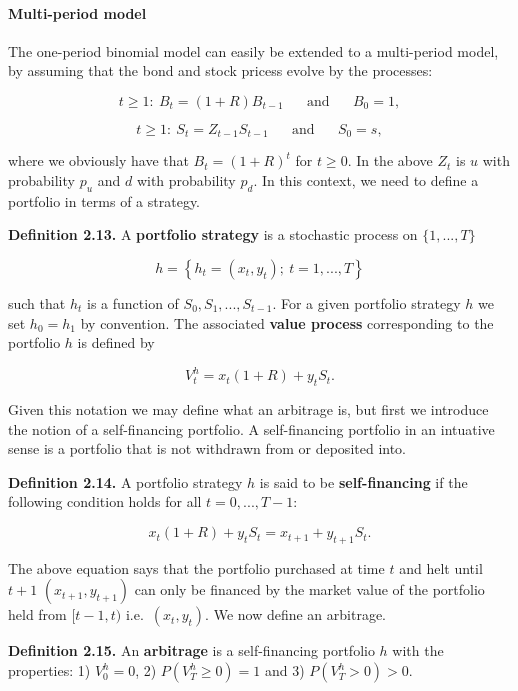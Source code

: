 \documentclass[
]{article}
\begin{document}
\hypertarget{multi-period-model}{%
\paragraph{Multi-period model}\label{multi-period-model}}

The one-period binomial model can easily be extended to a multi-period
model, by assuming that the bond and stock pricess evolve by the
processes:

\[
t\ge1:\ B_t=(1+R)B_{t-1}\hspace{20pt}\text{and}\hspace{20pt}B_0=1,
\]

\[
t\ge1:\ S_t=Z_{t-1}S_{t-1}\hspace{20pt}\text{and}\hspace{20pt}S_0=s,
\]

where we obviously have that \(B_t=(1+R)^t\) for \(t\ge 0\). In the
above \(Z_t\) is \(u\) with probability \(p_u\) and \(d\) with
probability \(p_d\). In this context, we need to define a portfolio in
terms of a strategy.

\textbf{Definition 2.13.} A \textbf{portfolio strategy} is a stochastic
process on \(\{1,...,T\}\)

\[
h=\left\{h_t=(x_t,y_t);\ t=1,...,T\right\}
\]

such that \(h_t\) is a function of \(S_0,S_1,...,S_{t-1}\). For a given
portfolio strategy \(h\) we set \(h_0=h_1\) by convention. The
associated \textbf{value process} corresponding to the portfolio \(h\)
is defined by

\[
V_t^h=x_t(1+R)+y_tS_t.
\]

Given this notation we may define what an arbitrage is, but first we
introduce the notion of a self-financing portfolio. A self-financing
portfolio in an intuative sense is a portfolio that is not withdrawn
from or deposited into.

\textbf{Definition 2.14.} A portfolio strategy \(h\) is said to be
\textbf{self-financing} if the following condition holds for all
\(t=0,...,T-1\):

\[
x_t(1+R)+y_tS_t=x_{t+1}+y_{t+1}S_t.
\]

The above equation says that the portfolio purchased at time \(t\) and
helt until \(t+1\) \((x_{t+1},y_{t+1})\) can only be financed by the
market value of the portfolio held from \([t-1,t)\)
i.e.~\((x_{t},y_{t})\). We now define an arbitrage.

\textbf{Definition 2.15.} An \textbf{arbitrage} is a self-financing
portfolio \(h\) with the properties: 1) \(V^h_0=0\), 2)
\(P(V^h_T\ge 0)=1\) and 3) \(P(V^h_T>0)>0\).
\end{document}
